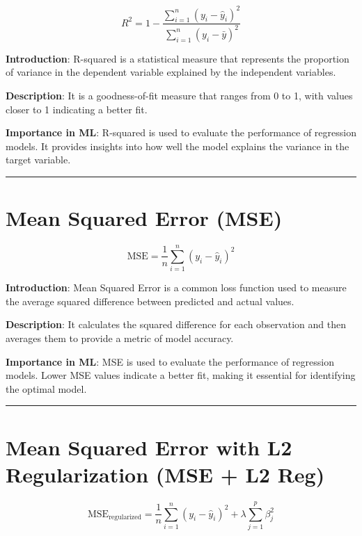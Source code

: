 \documentclass[
  12 pt,
  a4paper,
]{book}
\numberwithin{equation}{section}
\theoremstyle{plain}      %
\theoremstyle{definition} %
\theoremstyle{remark}     %
\theoremstyle{note}         %
\begin{document}
\[
R^2 = 1 - \frac{\sum_{i=1}^n (y_i - \hat{y}_i)^2}{\sum_{i=1}^n (y_i - \bar{y})^2}
\]

\textbf{Introduction}: R-squared is a statistical measure that
represents the proportion of variance in the dependent variable
explained by the independent variables.

\textbf{Description}: It is a goodness-of-fit measure that ranges from 0
to 1, with values closer to 1 indicating a better fit.

\textbf{Importance in ML}: R-squared is used to evaluate the performance
of regression models. It provides insights into how well the model
explains the variance in the target variable.

\begin{center}\rule{0.5\linewidth}{0.5pt}\end{center}

\newpage

\hypertarget{mean-squared-error-mse}{%
\chapter{Mean Squared Error (MSE)}\label{mean-squared-error-mse}}

\[
\text{MSE} = \frac{1}{n} \sum_{i=1}^n (y_i - \hat{y}_i)^2
\]

\textbf{Introduction}: Mean Squared Error is a common loss function used
to measure the average squared difference between predicted and actual
values.

\textbf{Description}: It calculates the squared difference for each
observation and then averages them to provide a metric of model
accuracy.

\textbf{Importance in ML}: MSE is used to evaluate the performance of
regression models. Lower MSE values indicate a better fit, making it
essential for identifying the optimal model.

\begin{center}\rule{0.5\linewidth}{0.5pt}\end{center}

\newpage

\hypertarget{mean-squared-error-with-l2-regularization-mse-l2-reg}{%
\chapter{Mean Squared Error with L2 Regularization (MSE + L2
Reg)}\label{mean-squared-error-with-l2-regularization-mse-l2-reg}}

\[
\text{MSE}_{\text{regularized}} = \frac{1}{n} \sum_{i=1}^n (y_i - \hat{y}_i)^2 + \lambda \sum_{j=1}^p \beta_j^2
\]
\end{document}
